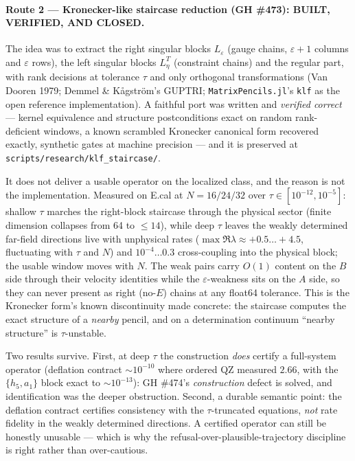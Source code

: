 \paragraph{Route 2 --- Kronecker-like staircase reduction (GH \#473):
BUILT, VERIFIED, AND CLOSED.} The idea was to extract the right singular
blocks $L_\varepsilon$ (gauge chains, $\varepsilon+1$ columns and
$\varepsilon$ rows), the left singular blocks $L_\eta^T$ (constraint
chains) and the regular part, with rank decisions at tolerance $\tau$ and
only orthogonal transformations (Van Dooren 1979; Demmel \&
K\aa gstr\"om's GUPTRI; \texttt{MatrixPencils.jl}'s \texttt{klf} as the
open reference implementation). A faithful port was written and
\emph{verified correct} --- kernel equivalence and structure
postconditions exact on random rank-deficient windows, a known scrambled
Kronecker canonical form recovered exactly, synthetic gates at machine
precision --- and it is preserved at
\texttt{scripts/research/klf\_staircase/}.

It does not deliver a usable operator on the localized class, and the
reason is not the implementation. Measured on E.cal at $N=16/24/32$ over
$\tau \in [10^{-12}, 10^{-5}]$: shallow $\tau$ marches the right-block
staircase through the physical sector (finite dimension collapses from 64
to $\le 14$), while deep $\tau$ leaves the weakly determined far-field
directions live with unphysical rates ($\max\Re\lambda \approx
+0.5\ldots+4.5$, fluctuating with $\tau$ and $N$) and $10^{-4}\ldots0.3$
cross-coupling into the physical block; the usable window moves with $N$.
The weak pairs carry $O(1)$ content on the $B$ side through their
velocity identities while the $\varepsilon$-weakness sits on the $A$ side,
so they can never present as right (no-$E$) chains at any float64
tolerance. This is the Kronecker form's known discontinuity made concrete:
the staircase computes the exact structure of a \emph{nearby} pencil, and
on a determination continuum ``nearby structure'' is $\tau$-unstable.

Two results survive. First, at deep $\tau$ the construction \emph{does}
certify a full-system operator (deflation contract $\sim\!10^{-10}$ where
ordered QZ measured $2.66$, with the $\{h_5, a_1\}$ block exact to
$\sim\!10^{-13}$): GH \#474's \emph{construction} defect is solved, and
identification was the deeper obstruction. Second, a durable semantic
point: the deflation contract certifies consistency with the
$\tau$-truncated equations, \emph{not} rate fidelity in the weakly
determined directions. A certified operator can still be honestly
unusable --- which is why the refusal-over-plausible-trajectory
discipline is right rather than over-cautious.

